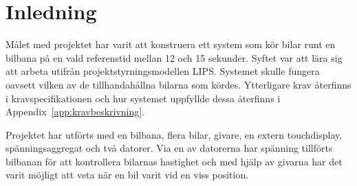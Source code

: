 \section{Inledning}

Målet med projektet har varit att konstruera ett system som kör bilar runt en
bilbana på en vald referenstid mellan 12 och 15
sekunder. Syftet var att lära sig att arbeta utifrån projektstyrningsmodellen
LIPS. Systemet skulle fungera oavsett vilken av de tillhandahållna bilarna som
kördes. Ytterligare krav återfinns i kravspecifikationen och hur systemet
uppfyllde dessa återfinns i Appendix~\ref{app:kravbeskrivning}.

Projektet har utförts med
en bilbana, flera bilar, givare, en extern touchdisplay, spänningsaggregat och
två datorer. Via en av datorerna har spänning tillförts bilbanan för att
kontrollera bilarnas hastighet och med hjälp av givarna har det varit möjligt
att veta när en bil varit vid en viss position.
